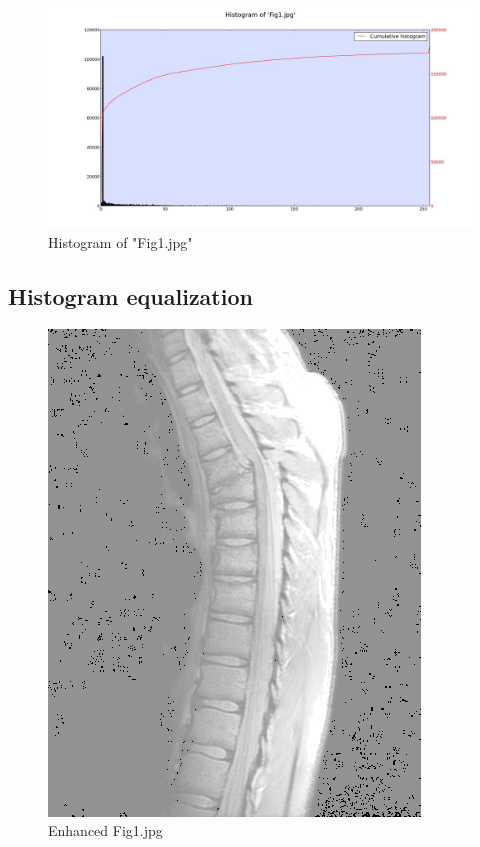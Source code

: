    \begin{figure}[h]
        \centering
        \includegraphics[width=\linewidth]{./images/Histogram_Fig1.jpg}
        \caption{Histogram of "Fig1.jpg"}
        \label{diagram:hist_fig1}
    \end{figure}

    \subsection{Histogram equalization}

    \begin{figure}[h]
        \centering
        \includegraphics[width=\linewidth]{./images/Enhanced_Fig1.jpg}
        \caption{Enhanced Fig1.jpg}
        \label{diagram:enhanced_fig1}
    \end{figure}

